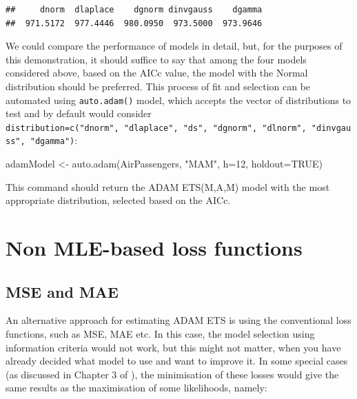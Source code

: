 \documentclass[
]{book}
\newenvironment{Shaded}{\begin{snugshade}}{\end{snugshade}}
\newcommand{\AttributeTok}[1]{\textcolor[rgb]{0.77,0.63,0.00}{#1}}
\newcommand{\ConstantTok}[1]{\textcolor[rgb]{0.00,0.00,0.00}{#1}}
\newcommand{\DecValTok}[1]{\textcolor[rgb]{0.00,0.00,0.81}{#1}}
\newcommand{\FunctionTok}[1]{\textcolor[rgb]{0.00,0.00,0.00}{#1}}
\newcommand{\NormalTok}[1]{#1}
\newcommand{\OtherTok}[1]{\textcolor[rgb]{0.56,0.35,0.01}{#1}}
\newcommand{\StringTok}[1]{\textcolor[rgb]{0.31,0.60,0.02}{#1}}
\theoremstyle{definition}
\theoremstyle{definition}
\theoremstyle{definition}
\theoremstyle{definition}
\theoremstyle{remark}
\begin{document}
\begin{verbatim}
##     dnorm  dlaplace    dgnorm dinvgauss    dgamma 
##  971.5172  977.4446  980.0950  973.5000  973.9646
\end{verbatim}

We could compare the performance of models in detail, but, for the purposes of this demonstration, it should suffice to say that among the four models considered above, based on the AICc value, the model with the Normal distribution should be preferred. This process of fit and selection can be automated using \texttt{auto.adam()} model, which accepts the vector of distributions to test and by default would consider \texttt{distribution=c("dnorm",\ "dlaplace",\ "ds",\ "dgnorm",\ "dlnorm",\ "dinvgauss",\ "dgamma")}:

\begin{Shaded}
\begin{Highlighting}[]
\NormalTok{adamModel }\OtherTok{\textless{}{-}} \FunctionTok{auto.adam}\NormalTok{(AirPassengers, }\StringTok{"MAM"}\NormalTok{, }\AttributeTok{h=}\DecValTok{12}\NormalTok{, }\AttributeTok{holdout=}\ConstantTok{TRUE}\NormalTok{)}
\end{Highlighting}
\end{Shaded}

This command should return the ADAM ETS(M,A,M) model with the most appropriate distribution, selected based on the AICc.

\hypertarget{non-mle-based-loss-functions}{%
\section{Non MLE-based loss functions}\label{non-mle-based-loss-functions}}

\hypertarget{MSEandMAEEstimators}{%
\subsection{MSE and MAE}\label{MSEandMAEEstimators}}

An alternative approach for estimating ADAM ETS is using the conventional loss functions, such as MSE, MAE etc. In this case, the model selection using information criteria would not work, but this might not matter, when you have already decided what model to use and want to improve it. In some special cases (as discussed in Chapter 3 of \citet{SvetunkovSBA}), the minimisation of these losses would give the same results as the maximisation of some likelihoods, namely:
\end{document}
